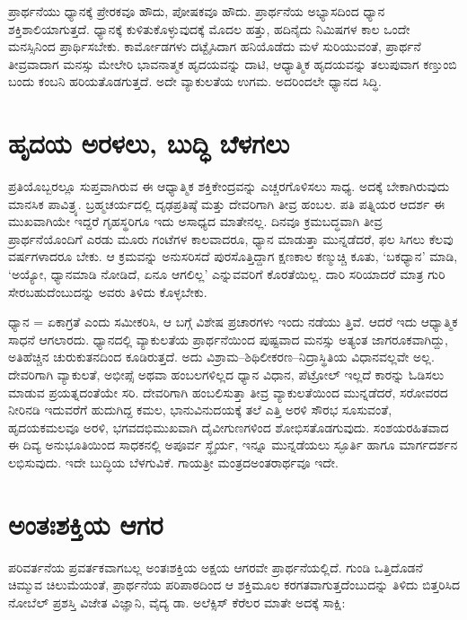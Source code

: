 ಪ್ರಾರ್ಥನೆಯು ಧ್ಯಾನಕ್ಕೆ ಪ್ರೇರಕವೂ ಹೌದು, ಪೋಷಕವೂ ಹೌದು. ಪ್ರಾರ್ಥನೆಯ ಅಭ್ಯಾಸದಿಂದ ಧ್ಯಾನ ಶಕ್ತಿಶಾಲಿಯಾಗುತ್ತದೆ. ಧ್ಯಾನಕ್ಕೆ ಕುಳಿತುಕೊಳ್ಳುವುದಕ್ಕೆ ಮೊದಲ ಹತ್ತು, ಹದಿನೈದು ನಿಮಿಷಗಳ ಕಾಲ ಒಂದೇ ಮನಸ್ಸಿನಿಂದ ಪ್ರಾರ್ಥಿಸಬೇಕು. ಕಾರ್ಮೋಡಗಳು ದಟ್ಟೈಸಿದಾಗ ಹನಿಯೊಡೆದು ಮಳೆ ಸುರಿಯುವಂತೆ, ಪ್ರಾರ್ಥನೆ ತೀವ್ರವಾದಾಗ ಮನಸ್ಸು ಮೇಲೇರಿ ಭಾವನಾತ್ಮಕ ಹೃದಯವನ್ನು ದಾಟಿ, ಆಧ್ಯಾತ್ಮಿಕ ಹೃದಯವನ್ನು ತಲುಪುವಾಗ ಕಣ್ತುಂಬಿ ಬಂದು ಕಂಬನಿ ಹರಿಯತೊಡಗುತ್ತದೆ. ಅದೇ ವ್ಯಾಕುಲತೆಯ ಉಗಮ. ಅದರಿಂದಲೇ ಧ್ಯಾನದ ಸಿದ್ಧಿ.


\section*{ಹೃದಯ ಅರಳಲು, ಬುದ್ಧಿ ಬೆಳಗಲು}


ಪ್ರತಿಯೊಬ್ಬರಲ್ಲೂ ಸುಪ್ತವಾಗಿರುವ ಈ ಆಧ್ಯಾತ್ಮಿಕ ಶಕ್ತಿಕೇಂದ್ರವನ್ನು ಎಚ್ಚರಗೊಳಿಸಲು ಸಾಧ್ಯ. ಅದಕ್ಕೆ ಬೇಕಾಗಿರುವುದು ಮಾನಸಿಕ ಪಾವಿತ್ರ್ಯ. ಬ್ರಹ್ಮಚರ್ಯದಲ್ಲಿ ದೃಢಪ್ರತಿಷ್ಠೆ ಮತ್ತು ದೇವರಿಗಾಗಿ ತೀವ್ರ ಹಂಬಲ. ಪತಿ ಪತ್ನಿಯರ ಆದರ್ಶ ಈ ಮುಖವಾಗಿಯೇ ಇದ್ದರೆ ಗೃಹಸ್ಥರಿಗೂ ಇದು ಅಸಾಧ್ಯದ ಮಾತೇನಲ್ಲ. ದಿನವೂ ಕ್ರಮಬದ್ಧವಾಗಿ ತೀವ್ರ ಪ್ರಾರ್ಥನೆಯೊಂದಿಗೆ ಎರಡು ಮೂರು ಗಂಟೆಗಳ ಕಾಲವಾದರೂ, ಧ್ಯಾನ ಮಾಡುತ್ತಾ ಮುನ್ನಡೆದರೆ, ಫಲ ಸಿಗಲು ಕೆಲವು ವರ್ಷಗಳಾದರೂ ಬೇಕು. ಆ ಕ್ರಮವನ್ನು ಅನುಸರಿಸದೆ ಪುರಸೊತ್ತಿದ್ದಾಗ ಕ್ಷಣಕಾಲ ಕಣ್ಮುಚ್ಚಿ ಕೂತು, ‘ಬಕಧ್ಯಾನ’ ಮಾಡಿ, ‘ಅಯ್ಯೋ, ಧ್ಯಾನಮಾಡಿ ನೋಡಿದೆ, ಏನೂ ಆಗಲಿಲ್ಲ’ ಎನ್ನುವವರಿಗೆ ಕೊರತೆಯಿಲ್ಲ. ದಾರಿ ಸರಿಯಾದರೆ ಮಾತ್ರ ಗುರಿ ಸೇರಬಹುದೆಂಬುದನ್ನು ಅವರು ತಿಳಿದು ಕೊಳ್ಳಬೇಕು.

ಧ್ಯಾನ = ಏಕಾಗ್ರತೆ ಎಂದು ಸಮೀಕರಿಸಿ, ಆ ಬಗ್ಗೆ ವಿಶೇಷ ಪ್ರಚಾರಗಳು ಇಂದು ನಡೆಯು ತ್ತಿವೆ. ಆದರೆ ಇದು ಆಧ್ಯಾತ್ಮಿಕ ಸಾಧನೆ ಆಗಲಾರದು. ಧ್ಯಾನದಲ್ಲಿ ವ್ಯಾಕುಲತೆಯ ಪ್ರಾರ್ಥನೆಯಿಂದ ಪುಷ್ಟವಾದ ಮನಸ್ಸು ಅತ್ಯಂತ ಜಾಗರೂಕವಾಗಿದ್ದು, ಅತಿಹೆಚ್ಚಿನ ಚುರುಕುತನದಿಂದ ಕೂಡಿರುತ್ತದೆ. ಅದು ವಿಶ್ರಾಮ–ಶಿಥಿಲೀಕರಣ–ನಿದ್ರಾಸ್ಥಿತಿಯ ವಿಧಾನವಲ್ಲವೇ ಅಲ್ಲ. ದೇವರಿಗಾಗಿ ವ್ಯಾಕುಲತೆ, ಅಭೀಪ್ಸೆ ಅಥವಾ ಹಂಬಲಗಳಿಲ್ಲದ ಧ್ಯಾನ ವಿಧಾನ, ಪೆಟ್ರೋಲ್ ಇಲ್ಲದೆ ಕಾರನ್ನು ಓಡಿಸಲು ಮಾಡುವ ಪ್ರಯತ್ನದಂತೆಯೇ ಸರಿ. ದೇವರಿಗಾಗಿ ಹಂಬಲಿಸುತ್ತಾ ತೀವ್ರ ವ್ಯಾಕುಲತೆಯಿಂದ ಮುನ್ನಡೆದರೆ, ಸರೋವರದ ನೀರಿನಡಿ ಇದುವರೆಗೆ ಹುದುಗಿದ್ದ ಕಮಲ, ಭಾನುವಿನುದಯಕ್ಕೆ ತಲೆ ಎತ್ತಿ ಅರಳಿ ಸೌರಭ ಸೂಸುವಂತೆ, ಹೃದಯಕಮಲವೂ ಅರಳಿ, ಭಗವ\-ದಭಿಮುಖ\-ವಾಗಿ ದೈವೀಗುಣಗಳಿಂದ ಶೋಭಿಸತೊಡಗುವುದು. ಸಂಶಯರಹಿತವಾದ ಈ ದಿವ್ಯ ಅನುಭೂತಿಯಿಂದ ಸಾಧಕನಲ್ಲಿ ಅಪೂರ್ವ ಸ್ಥೈರ್ಯ, ಇನ್ನೂ ಮುನ್ನಡೆಯಲು ಸ್ಫೂರ್ತಿ ಹಾಗೂ ಮಾರ್ಗದರ್ಶನ ಲಭಿಸುವುದು. ಇದೇ ಬುದ್ಧಿಯ ಬೆಳಗುವಿಕೆ. ಗಾಯತ್ರೀ ಮಂತ್ರದ\break ಅಂತರಾರ್ಥವೂ ಇದೇ.

\newpage


\section*{ಅಂತಃಶಕ್ತಿಯ ಆಗರ}


ಪರಿವರ್ತನೆಯ ಪ್ರವರ್ತಕವಾಗಬಲ್ಲ ಅಂತಃಶಕ್ತಿಯ ಅಕ್ಷಯ ಆಗರವೇ ಪ್ರಾರ್ಥನೆಯಲ್ಲಿದೆ. ಗುಂಡಿ ಒತ್ತಿದೊಡನೆ ಚಿಮ್ಮುವ ಚಿಲುಮೆಯಂತೆ, ಪ್ರಾರ್ಥನೆಯ ಪರಿಪಾಠದಿಂದ ಆ ಶಕ್ತಿಮೂಲ ಕರಗತವಾಗುತ್ತದೆಂಬುದನ್ನು ತಿಳಿದು ಬಿತ್ತರಿಸಿದ ನೋಬೆಲ್ ಪ್ರಶಸ್ತಿ ವಿಜೇತ ವಿಜ್ಞಾನಿ, ವೈದ್ಯ ಡಾ. ಅಲೆಕ್ಸಿಸ್ ಕೆರೆಲರ ಮಾತೇ ಅದಕ್ಕೆ ಸಾಕ್ಷಿ:

